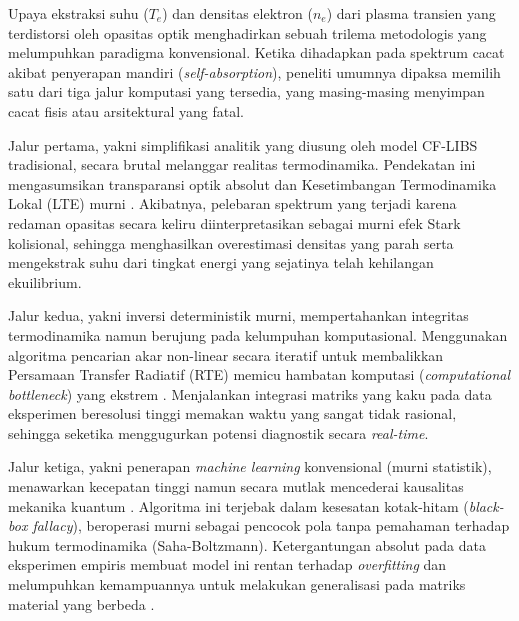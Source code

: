 \documentclass[10pt,leqno]{amsart}
\begin{document}
Upaya ekstraksi suhu ($T_e$) dan densitas elektron ($n_e$) dari plasma transien yang terdistorsi oleh opasitas optik menghadirkan sebuah trilema metodologis yang melumpuhkan paradigma konvensional. Ketika dihadapkan pada spektrum cacat akibat penyerapan mandiri (\textit{self-absorption}), peneliti umumnya dipaksa memilih satu dari tiga jalur komputasi yang tersedia, yang masing-masing menyimpan cacat fisis atau arsitektural yang fatal.

Jalur pertama, yakni simplifikasi analitik yang diusung oleh model CF-LIBS tradisional, secara brutal melanggar realitas termodinamika. Pendekatan ini mengasumsikan transparansi optik absolut dan Kesetimbangan Termodinamika Lokal (LTE) murni \cite{cristoforetti_local_2010}. Akibatnya, pelebaran spektrum yang terjadi karena redaman opasitas secara keliru diinterpretasikan sebagai murni efek Stark kolisional, sehingga menghasilkan overestimasi densitas yang parah serta mengekstrak suhu dari tingkat energi yang sejatinya telah kehilangan ekuilibrium.

Jalur kedua, yakni inversi deterministik murni, mempertahankan integritas termodinamika namun berujung pada kelumpuhan komputasional. Menggunakan algoritma pencarian akar non-linear secara iteratif untuk membalikkan Persamaan Transfer Radiatif (RTE) memicu hambatan komputasi (\textit{computational bottleneck}) yang ekstrem \cite{rodriguez_mixkiprapcal_2021,espinosa_analysis_2019}. Menjalankan integrasi matriks yang kaku pada data eksperimen beresolusi tinggi memakan waktu yang sangat tidak rasional, sehingga seketika menggugurkan potensi diagnostik secara \textit{real-time}.

Jalur ketiga, yakni penerapan \textit{machine learning} konvensional (murni statistik), menawarkan kecepatan tinggi namun secara mutlak mencederai kausalitas mekanika kuantum \cite{m_s_machine_2025}. Algoritma ini terjebak dalam kesesatan kotak-hitam (\textit{black-box fallacy}), beroperasi murni sebagai pencocok pola tanpa pemahaman terhadap hukum termodinamika (Saha-Boltzmann). Ketergantungan absolut pada data eksperimen empiris membuat model ini rentan terhadap \textit{overfitting} dan melumpuhkan kemampuannya untuk melakukan generalisasi pada matriks material yang berbeda \cite{favre_towards_2025}.
\end{document}
